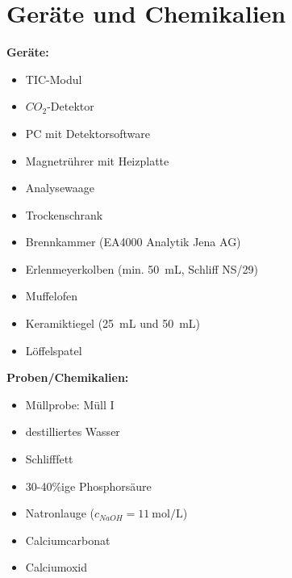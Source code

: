 \chapter{Geräte und Chemikalien}
\label{sec:geraete}

\textbf{Geräte:}
\begin{itemize}
	\item TIC-Modul
	\item $CO_2$-Detektor
	\item PC mit Detektorsoftware
	\item Magnetrührer mit Heizplatte
	\item Analysewaage
	\item Trockenschrank
	\item Brennkammer (EA4000 Analytik Jena AG)
	\item Erlenmeyerkolben (min. \SI{50}{\milli \liter}, Schliff NS/29)
	\item Muffelofen
	\item Keramiktiegel (\SI{25}{\milli \liter} und \SI{50}{\milli \liter})
	\item Löffelspatel
\end{itemize}

\vspace*{5mm}

\textbf{Proben/Chemikalien:}
\begin{itemize}
	\item Müllprobe: Müll I
	\item destilliertes Wasser
	\item Schlifffett
	\item 30-40\%ige Phosphorsäure
	\item Natronlauge ($c_{NaOH}=\SI{11}{\mole \per \liter}$)
	\item Calciumcarbonat
	\item Calciumoxid
\end{itemize}


